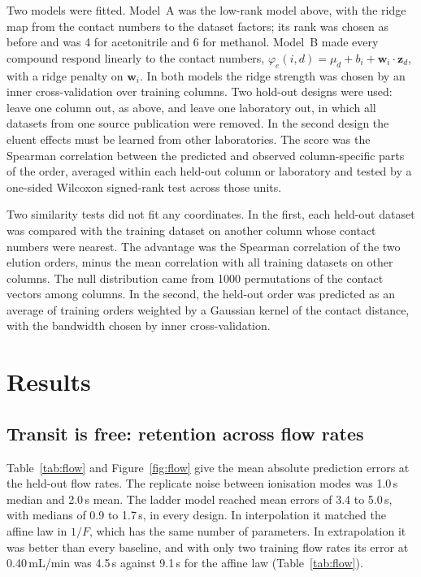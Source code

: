 \documentclass[11pt,a4paper]{article}
\theoremstyle{definition}
\theoremstyle{remark}
\begin{document}
Two models were fitted.
Model~A was the low-rank model above, with the ridge map from the contact numbers to the dataset factors; its rank was chosen as before and was 4 for acetonitrile and 6 for methanol.
Model~B made every compound respond linearly to the contact numbers, $\varphi_e(i,d)=\mu_d+b_i+\mathbf w_i\cdot\mathbf z_d$, with a ridge penalty on $\mathbf w_i$.
In both models the ridge strength was chosen by an inner cross-validation over training columns.
Two hold-out designs were used: leave one column out, as above, and leave one laboratory out, in which all datasets from one source publication were removed.
In the second design the eluent effects must be learned from other laboratories.
The score was the Spearman correlation between the predicted and observed column-specific parts of the order, averaged within each held-out column or laboratory and tested by a one-sided Wilcoxon signed-rank test across those units.

Two similarity tests did not fit any coordinates.
In the first, each held-out dataset was compared with the training dataset on another column whose contact numbers were nearest.
The advantage was the Spearman correlation of the two elution orders, minus the mean correlation with all training datasets on other columns.
The null distribution came from 1000 permutations of the contact vectors among columns.
In the second, the held-out order was predicted as an average of training orders weighted by a Gaussian kernel of the contact distance, with the bandwidth chosen by inner cross-validation.

\section{Results}
\label{sec:results}

\subsection{Transit is free: retention across flow rates}

Table~\ref{tab:flow} and Figure~\ref{fig:flow} give the mean absolute prediction errors at the held-out flow rates.
The replicate noise between ionisation modes was 1.0\,s median and 2.0\,s mean.
The ladder model reached mean errors of 3.4 to 5.0\,s, with medians of 0.9 to 1.7\,s, in every design.
In interpolation it matched the affine law in $1/F$, which has the same number of parameters.
In extrapolation it was better than every baseline, and with only two training flow rates its error at 0.40\,mL/min was 4.5\,s against 9.1\,s for the affine law (Table~\ref{tab:flow}).
\end{document}
